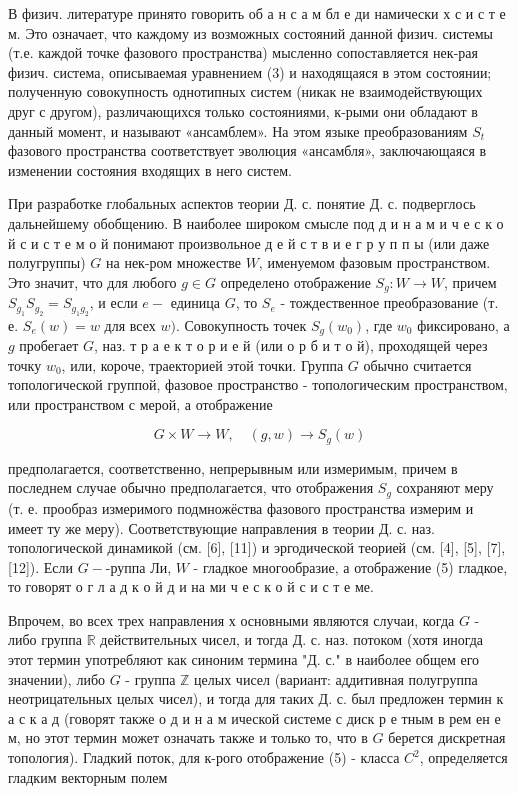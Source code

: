 \documentclass[10pt]{article}
\begin{document}
В физич. литературе принято говорить об а н с а м бл е ди намически х с и с т е м. Это означает, что каждому из возможных состояний данной физич. системы (т.е. каждой точке фазового пространства) мысленно сопоставляется нек-рая физич. система, описываемая уравнением (3) и находящаяся в этом состоянии; полученную совокупность однотипных систем (никак не взаимодействующих друг с другом), различающихся только состояниями, к-рыми они обладают в данный момент, и называют «ансамблем». На этом языке преобразованиям $S_{t}$ фазового пространства соответствует эволюция «ансамбля», заключающаяся в изменении состояния входящих в него систем.



При разработке глобальных аспектов теории Д. с. понятие Д. с. подверглось дальнейшему обобщению. В наиболее широком смысле под д и н а м и ч е с к о й с и с т е м о й понимают произвольное д е й с т в и е г р у п п ы (или даже полугруппы) $G$ на нек-ром множестве $W$, именуемом фазовым пространством. Это значит, что для любого $g \in G$ определено отображение $S_{g}: W \rightarrow W$, причем $S_{g_{1}} S_{g_{2}}=S_{g_{1} g_{2}}$, и если $e-$ единица $G$, то $S_{e}$ - тождественное преобразование (т. е. $S_{e}(w)=w$ для всех $w)$. Совокупность точек $S_{g}\left(w_{0}\right)$, где $w_{0}$ фиксировано, а $g$ пробегает $G$, наз. т р а е к т о р и е й (или о р б и т о й), проходящей через точку $w_{0}$, или, короче, траекторией этой точки. Группа $G$ обычно считается топологической группой, фазовое пространство - топологическим пространством, или пространством с мерой, а отображение



\[

G \times W \longrightarrow W, \quad(g, w) \longrightarrow S_{g}(w)

\]



предполагается, соответственно, непрерывным или измеримым, причем в последнем случае обычно предполагается, что отображения $S_{g}$ сохраняют меру (т. е. прообраз измеримого подмножёства фазового пространства измерим и имеет ту же меру). Соответствующие направления в теории Д. с. наз. топологической динамикой (см. [6], [11]) и эргодической теорией (см. [4], [5], [7], [12]). Если $G-$-руппа Ли, $W$ - гладкое многообразие, а отображение (5) гладкое, то говорят о г л а д к о й д и на ми ч е с к о й с и с т е ме.



Впрочем, во всех трех направления х основными являются случаи, когда $G$ - либо группа $\mathbb{R}$ действительных чисел, и тогда Д. с. наз. потоком (хотя иногда этот термин употребляют как синоним термина "Д. с." в наиболее общем его значении), либо $G$ - группа $\mathbb{Z}$ целых чисел (вариант: аддитивная полугруппа неотрицательных целых чисел), и тогда для таких Д. с. был предложен термин к а с к а д (говорят также о д и н а м ической системе с диск р е тным в рем ен е м, но этот термин может означать также и только то, что в $G$ берется дискретная топология). Гладкий поток, для к-рого отображение (5) - класса $C^{2}$, определяется гладким векторным полем
\end{document}
